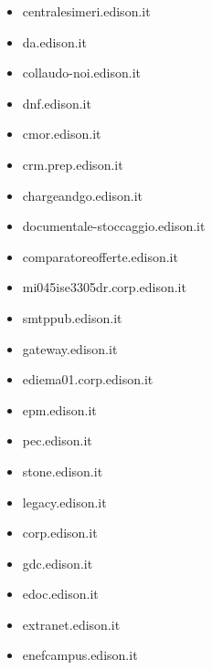 \documentclass{article}
\begin{document}
\begin{itemize}
        \item centralesimeri.edison.it
    
        \item da.edison.it
    
        \item collaudo-noi.edison.it
    
        \item dnf.edison.it
    
        \item cmor.edison.it
    
        \item crm.prep.edison.it
    
        \item chargeandgo.edison.it
    
        \item documentale-stoccaggio.edison.it
    
        \item comparatoreofferte.edison.it
    
        \item mi045ise3305dr.corp.edison.it
    
        \item smtppub.edison.it
    
        \item gateway.edison.it
    
        \item ediema01.corp.edison.it
    
        \item epm.edison.it
    
        \item pec.edison.it
    
        \item stone.edison.it
    
        \item legacy.edison.it
    
        \item corp.edison.it
    
        \item gdc.edison.it
    
        \item edoc.edison.it
    
        \item extranet.edison.it
    
        \item enefcampus.edison.it
    

\end{itemize}
\end{document}
